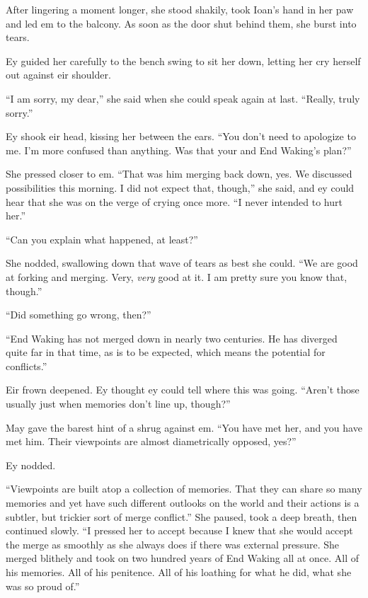 After lingering a moment longer, she stood shakily, took Ioan's hand in her paw and led em to the balcony. As soon as the door shut behind them, she burst into tears.

Ey guided her carefully to the bench swing to sit her down, letting her cry herself out against eir shoulder.

``I am sorry, my dear,'' she said when she could speak again at last. ``Really, truly sorry.''

Ey shook eir head, kissing her between the ears. ``You don't need to apologize to me. I'm more confused than anything. Was that your and End Waking's plan?''

She pressed closer to em. ``That was him merging back down, yes. We discussed possibilities this morning. I did not expect that, though,'' she said, and ey could hear that she was on the verge of crying once more. ``I never intended to hurt her.''

``Can you explain what happened, at least?''

She nodded, swallowing down that wave of tears as best she could. ``We are good at forking and merging. Very, \emph{very} good at it. I am pretty sure you know that, though.''

``Did something go wrong, then?''

``End Waking has not merged down in nearly two centuries. He has diverged quite far in that time, as is to be expected, which means the potential for conflicts.''

Eir frown deepened. Ey thought ey could tell where this was going. ``Aren't those usually just when memories don't line up, though?''

May gave the barest hint of a shrug against em. ``You have met her, and you have met him. Their viewpoints are almost diametrically opposed, yes?''

Ey nodded.

``Viewpoints are built atop a collection of memories. That they can share so many memories and yet have such different outlooks on the world and their actions is a subtler, but trickier sort of merge conflict.'' She paused, took a deep breath, then continued slowly. ``I pressed her to accept because I knew that she would accept the merge as smoothly as she always does if there was external pressure. She merged blithely and took on two hundred years of End Waking all at once. All of his memories. All of his penitence. All of his loathing for what he did, what she was so proud of.''

